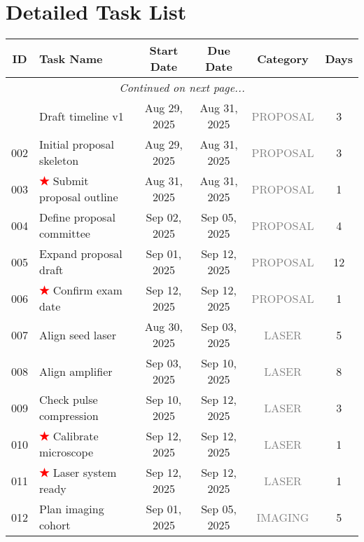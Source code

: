 \documentclass[portrait,a4paper]{article}
\begin{document}
\newpage
\section*{Detailed Task List}
\vspace{0.5cm}

\renewcommand{\arraystretch}{1.3}
\begin{longtable}{|c|p{}|c|c|c|c|}
\hline
\rowcolor{blue!10}
\textbf{ID} & \textbf{Task Name} & \textbf{Start Date} & \textbf{Due Date} & \textbf{Category} & \textbf{Days} \\
\hline
\endhead

\hline
\multicolumn{6}{|c|}{\textit{Continued on next page...}} \\
\hline
\endfoot

\hline
\endlastfoot
001 & Draft timeline v1 & Aug 29, 2025 & Aug 31, 2025 & \textcolor{gray}{PROPOSAL} & 3 \\
\hline
002 & Initial proposal skeleton & Aug 29, 2025 & Aug 31, 2025 & \textcolor{gray}{PROPOSAL} & 3 \\
\hline
003 & \textcolor{red}{\textbf{★}} Submit proposal outline & Aug 31, 2025 & Aug 31, 2025 & \textcolor{gray}{PROPOSAL} & 1 \\
\hline
004 & Define proposal committee & Sep 02, 2025 & Sep 05, 2025 & \textcolor{gray}{PROPOSAL} & 4 \\
\hline
005 & Expand proposal draft & Sep 01, 2025 & Sep 12, 2025 & \textcolor{gray}{PROPOSAL} & 12 \\
\hline
006 & \textcolor{red}{\textbf{★}} Confirm exam date & Sep 12, 2025 & Sep 12, 2025 & \textcolor{gray}{PROPOSAL} & 1 \\
\hline
007 & Align seed laser & Aug 30, 2025 & Sep 03, 2025 & \textcolor{gray}{LASER} & 5 \\
\hline
008 & Align amplifier & Sep 03, 2025 & Sep 10, 2025 & \textcolor{gray}{LASER} & 8 \\
\hline
009 & Check pulse compression & Sep 10, 2025 & Sep 12, 2025 & \textcolor{gray}{LASER} & 3 \\
\hline
010 & \textcolor{red}{\textbf{★}} Calibrate microscope & Sep 12, 2025 & Sep 12, 2025 & \textcolor{gray}{LASER} & 1 \\
\hline
011 & \textcolor{red}{\textbf{★}} Laser system ready & Sep 12, 2025 & Sep 12, 2025 & \textcolor{gray}{LASER} & 1 \\
\hline
012 & Plan imaging cohort & Sep 01, 2025 & Sep 05, 2025 & \textcolor{gray}{IMAGING} & 5 \\

\end{longtable}
\end{document}
